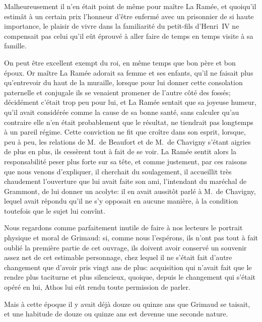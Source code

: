 Malheureusement il n'en était point de même pour maître La Ramée, et quoiqu'il estimât à un certain prix l'honneur d'être enfermé avec un prisonnier de si haute importance, le plaisir de vivre dans la familiarité du petit-fils d'Henri~IV ne compensait pas celui qu'il eût éprouvé à aller faire de temps en temps visite à sa famille.

On peut être excellent exempt du roi, en même temps que bon père et bon époux. Or maître La Ramée adorait sa femme et ses enfants, qu'il ne faisait plus qu'entrevoir du haut de la muraille, lorsque pour lui donner cette consolation paternelle et conjugale ils se venaient promener de l'autre côté des fossés; décidément c'était trop peu pour lui, et La Ramée sentait que sa joyeuse humeur, qu'il avait considérée comme la cause de sa bonne santé, sans calculer qu'au contraire elle n'en était probablement que le résultat, ne tiendrait pas longtemps à un pareil régime. Cette conviction ne fit que croître dans son esprit, lorsque, peu à peu, les relations de M.~de Beaufort et de M.~de Chavigny s'étant aigries de plus en plus, ils cessèrent tout à fait de se voir. La Ramée sentit alors la responsabilité peser plus forte sur sa tête, et comme justement, par ces raisons que nous venons d'expliquer, il cherchait du soulagement, il accueillit très chaudement l'ouverture que lui avait faite son ami, l'intendant du maréchal de Grammont, de lui donner un acolyte: il en avait aussitôt parlé à M.~de Chavigny, lequel avait répondu qu'il ne s'y opposait en aucune manière, à la condition toutefois que le sujet lui convînt.

Nous regardons comme parfaitement inutile de faire à nos lecteurs le portrait physique et moral de Grimaud: si, comme nous l'espérons, ils n'ont pas tout à fait oublié la première partie de cet ouvrage, ils doivent avoir conservé un souvenir assez net de cet estimable personnage, chez lequel il ne s'était fait d'autre changement que d'avoir pris vingt ans de plus: acquisition qui n'avait fait que le rendre plus taciturne et plus silencieux, quoique, depuis le changement qui s'était opéré en lui, Athos lui eût rendu toute permission de parler.

Mais à cette époque il y avait déjà douze ou quinze ans que Grimaud se taisait, et une habitude de douze ou quinze ans est devenue une seconde nature.